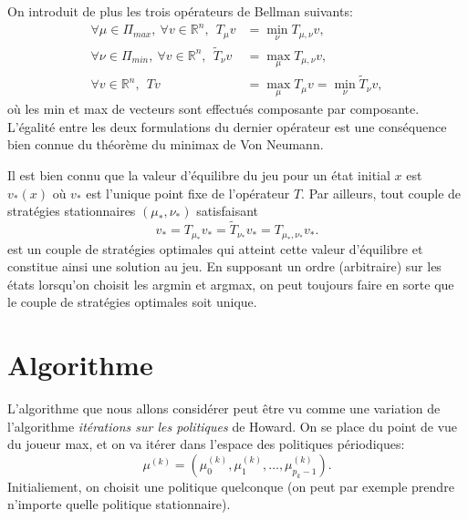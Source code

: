 \documentclass{article}
\def\R{\mathbb R}
\begin{document}
On introduit de plus les trois opérateurs de Bellman suivants:
\begin{align}
\forall \mu \in \Pi_{max},~ \forall v \in \R^n,~~  T_{\mu} v & = \min_\nu T_{\mu,\nu} v, \\
\forall \nu \in \Pi_{min},~ \forall v \in \R^n,~~  \tilde T_{\nu} v & = \max_\mu T_{\mu,\nu} v, \\
\forall v \in \R^n,~~  T v &= \max_\mu T_\mu v = \min_\nu \tilde T_\nu v,
\end{align}
où les min et max de vecteurs sont effectués composante par composante. L'égalité entre les deux formulations du dernier opérateur est une conséquence bien connue du théorème du minimax de Von Neumann.

Il est bien connu que la valeur d'équilibre du jeu pour un état initial $x$ est $v_*(x)$ où $v_*$ est l'unique point fixe de l'opérateur $T$. Par ailleurs, tout couple de stratégies stationnaires $(\mu_*,\nu_*)$ satisfaisant
$$
v_* = T_{\mu_*}v_* = \tilde T_{\nu_*} v_* = T_{\mu_*,\nu_*}v_*.
$$
est un couple de stratégies optimales qui atteint cette valeur d'équilibre et constitue ainsi une solution au jeu. En supposant un ordre (arbitraire) sur les états lorsqu'on choisit les argmin et argmax, on peut toujours faire en sorte que le couple de stratégies optimales soit unique.



\section{Algorithme}

L'algorithme que nous allons considérer peut être vu comme une variation de l'algorithme \emph{itérations sur les politiques} de Howard. On se place du point de vue du joueur max, et on va itérer dans l'espace des politiques périodiques:
$$
\mu^{(k)} = ( \mu^{(k)}_0, \mu^{(k)}_1, \dots, \mu^{(k)}_{p_k-1} ).
$$
Initialiement, on choisit une politique quelconque (on peut par exemple prendre n'importe quelle politique stationnaire).
\end{document}
